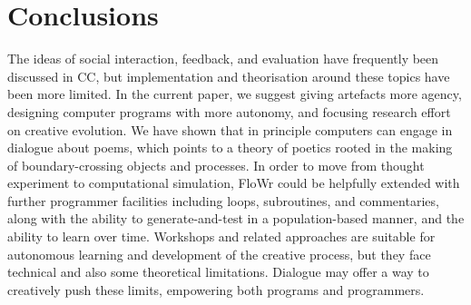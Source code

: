 \section{Conclusions}
\label{sec:conc}

The ideas of social interaction, feedback, and evaluation have frequently been discussed in CC, but implementation
and theorisation around these topics have been more limited.
In the current paper, we suggest giving artefacts more agency, designing computer programs with more autonomy, and focusing research effort on creative evolution.
We have shown that in principle computers can engage in dialogue about poems, which points to a theory of poetics rooted in the making of boundary-crossing objects and processes.
In order to move from thought experiment to computational simulation, FloWr could be helpfully extended with further programmer facilities including loops, subroutines, and commentaries, along with the ability to generate-and-test in a population-based manner, and the ability to learn over time.
Workshops and related approaches are suitable for autonomous learning and development of the creative process, but they face technical and also some theoretical limitations.   
Dialogue may offer a way to creatively push these limits, empowering both programs and programmers.


